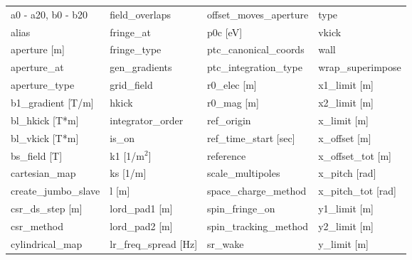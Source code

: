  \begin{tabular}{llll} \toprule
a0 - a20, b0 - b20               & field_overlaps                   & offset_moves_aperture            & type                             \\
alias                            & fringe_at                        & p0c [eV]                         & vkick                            \\
aperture [m]                     & fringe_type                      & ptc_canonical_coords             & wall                             \\
aperture_at                      & gen_gradients                    & ptc_integration_type             & wrap_superimpose                 \\
aperture_type                    & grid_field                       & r0_elec [m]                      & x1_limit [m]                     \\
b1_gradient [T/m]                & hkick                            & r0_mag [m]                       & x2_limit [m]                     \\
bl_hkick [T*m]                   & integrator_order                 & ref_origin                       & x_limit [m]                      \\
bl_vkick [T*m]                   & is_on                            & ref_time_start [sec]             & x_offset [m]                     \\
bs_field [T]                     & k1 [1/m$^2$]                     & reference                        & x_offset_tot [m]                 \\
cartesian_map                    & ks [1/m]                         & scale_multipoles                 & x_pitch [rad]                    \\
create_jumbo_slave               & l [m]                            & space_charge_method              & x_pitch_tot [rad]                \\
csr_ds_step [m]                  & lord_pad1 [m]                    & spin_fringe_on                   & y1_limit [m]                     \\
csr_method                       & lord_pad2 [m]                    & spin_tracking_method             & y2_limit [m]                     \\
cylindrical_map                  & lr_freq_spread [Hz]              & sr_wake                          & y_limit [m]                      \\

\end{tabular}
